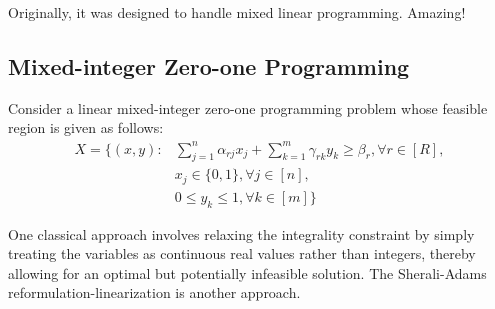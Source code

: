 \documentclass{article}
\begin{document}
\else
\fi

Originally, it was designed to handle mixed linear programming. Amazing!
\subsection{Mixed-integer Zero-one Programming}
Consider a linear mixed-integer zero-one programming problem whose feasible region is given as follows:
\begin{equation}
  \begin{align}
    X = \{(x,y): &\sum_{j=1}^n \alpha_{rj}x_j + \sum_{k=1}^m \gamma_{rk}y_k \geq \beta_r ,\forall r \in [R],\\ &x_j \in \{0,1\} ,\forall j \in [n], \\ &0\leq y_k \leq 1, \forall k \in [m] \}
  \end{align}
\end{equation}

One classical approach involves relaxing the integrality constraint by simply treating the variables as continuous real values rather than integers, thereby allowing for an optimal but potentially infeasible solution. The Sherali-Adams reformulation-linearization is another approach.




\ifx\allfiles\undefined
  
\end{document}
